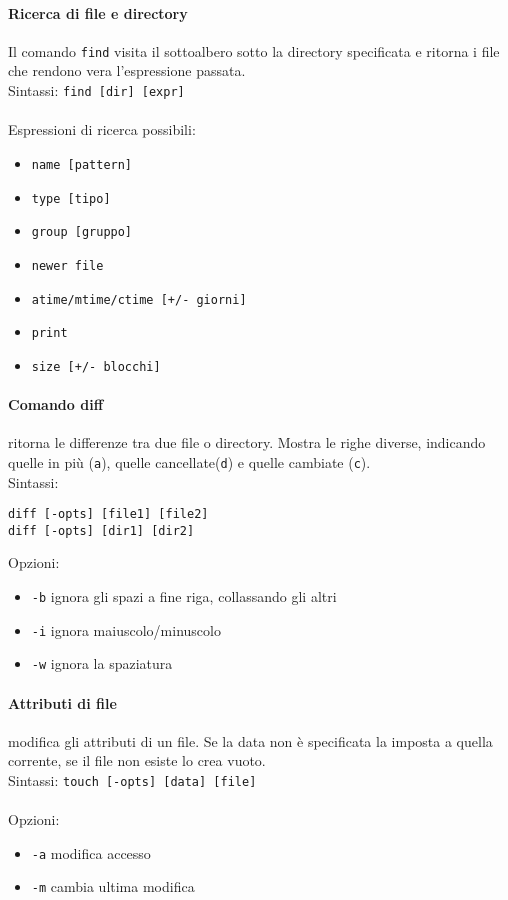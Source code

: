 \documentclass[a4paper]{article}
\begin{document}
\paragraph{Ricerca di file e directory} Il comando \verb|find| visita il sottoalbero sotto la directory specificata e ritorna i file che rendono vera l'espressione passata. \\
Sintassi: \verb|find [dir] [expr]|\\ \\
Espressioni di ricerca possibili:
\begin{itemize}
\item \verb|name [pattern]|
\item \verb|type [tipo]|
\item \verb|group [gruppo]|
\item \verb|newer file|
\item \verb|atime/mtime/ctime [+/- giorni]|
\item \verb|print|
\item \verb|size [+/- blocchi]|
\end{itemize}

\paragraph{Comando diff} ritorna le differenze tra due file o directory. Mostra le righe diverse, indicando quelle in più (\verb|a|), quelle cancellate(\verb|d|) e quelle cambiate (\verb|c|).\\
Sintassi:
\begin{verbatim}
diff [-opts] [file1] [file2]
diff [-opts] [dir1] [dir2]
\end{verbatim}
Opzioni:
\begin{itemize}
\item \verb|-b| ignora gli spazi a fine riga, collassando gli altri
\item \verb|-i| ignora maiuscolo/minuscolo
\item \verb|-w| ignora la spaziatura
\end{itemize}

\paragraph{Attributi di file} modifica gli attributi di un file. Se la data non è specificata la imposta a quella corrente, se il file non esiste lo crea vuoto. \\
Sintassi:
\verb|touch [-opts] [data] [file]| \\ \\
Opzioni:
\begin{itemize}
\item \verb|-a| modifica accesso
\item \verb|-m| cambia ultima modifica
\end{itemize}
\end{document}
